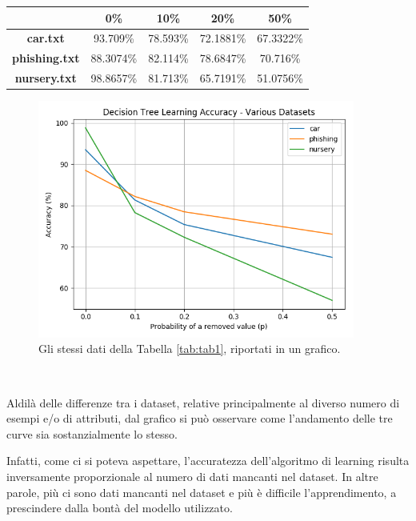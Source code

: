 \documentclass[a4paper,12pt]{article}
\begin{document}
\begin{center}
\vspace*{0.9cm}
\begin{tabular}{|c|c|c|c|c|}
\hline
& \textbf{0\%}\bigstrut & \textbf{10\%} & \textbf{20\%} & \textbf{50\%} \\\hline
\textbf{car.txt}\bigstrut & 93.709\% & 78.593\% & 72.1881\% & 67.3322\%\\\hline
\textbf{phishing.txt}\bigstrut & 88.3074\% & 82.114\% & 78.6847\% & 70.716\%\\\hline
\textbf{nursery.txt}\bigstrut & 98.8657\% & 81.713\% & 65.7191\% & 51.0756\%\\\hline
\end{tabular}
\captionsetup{justification=centering}
\label{tab:tab1}
\end{center}

\begin{figure}[h]
    \centering
    \vspace*{0.2cm}
    \captionsetup{justification=centering,margin=1cm}
    \includegraphics[width=0.93\textwidth]{./plot}
    \caption{Gli stessi dati della Tabella \ref{tab:tab1}, riportati in un grafico.}
    \label{fig:plot}
\end{figure}
\

Aldilà delle differenze tra i dataset, relative principalmente al diverso numero di esempi e/o di attributi, dal grafico si può osservare come l'andamento delle tre curve sia sostanzialmente lo stesso.
\newline

Infatti, come ci si poteva aspettare, l'accuratezza dell'algoritmo di learning risulta inversamente proporzionale al numero di dati mancanti nel dataset.  In altre parole, più ci sono dati mancanti nel dataset e più è difficile l'apprendimento, a prescindere dalla bontà del modello utilizzato.
\newline
\end{document}
